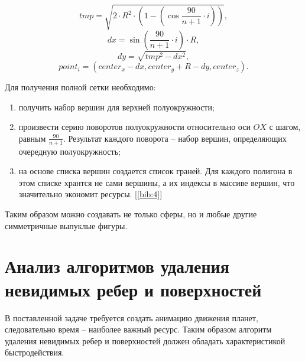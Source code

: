     \begin{equation}\label{formula:Sphere_Alg}
	tmp = \sqrt{2\cdot R^2 \cdot \left( 1 - \left( \cos{\frac{90}{n+1} \cdot i}\right) \right)},
	\end{equation}
	\begin{equation}\label{formula:Sphere_Alg_1}
	dx = \sin{\left( \frac{90}{n+1} \cdot i \right)} \cdot R,
	\end{equation}
	\begin{equation}\label{formula:Sphere_Alg_2}
	dy = \sqrt{tmp^2 - dx^2},
	\end{equation}
	\begin{equation}\label{formula:Sphere_Alg_3}
	point_i = (center_x - dx, center_y + R - dy, center_z).
	\end{equation}
	\par Для получения полной сетки необходимо:
	\begin{enumerate}
		\item получить набор вершин для верхней полуокружности;
		\item произвести серию поворотов полуокружности относительно оси \begin{math}OX\end{math} с шагом, равным \begin{math}\frac{90}{n+1}\end{math}. Результат каждого поворота -- набор вершин, определяющих очередную полуокружность;
		\item на основе списка вершин создается список граней. Для каждого полигона в этом списке хрантся не сами вершины, а их индексы в массиве вершин, что значительно экономит ресурсы. [\ref{bib:4}]
	\end{enumerate}
	\par Таким образом можно создавать не только сферы, но и любые другие симметричные выпуклые фигуры.

	\section{Анализ алгоритмов удаления невидимых ребер и поверхностей}
	\par В поставленной задаче требуется создать анимацию движения планет, следовательно время -- наиболее важный ресурс. Таким образом алгоритм удаления невидимых ребер и поверхностей должен обладать характеристикой быстродействия.

